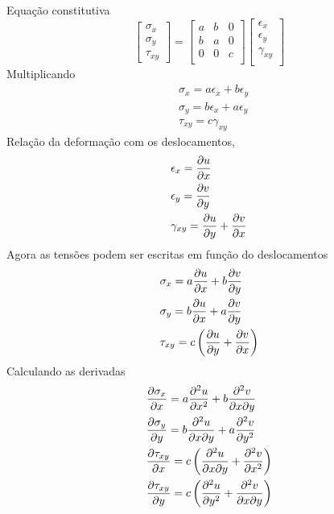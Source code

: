 Equação constitutiva
%
\begin{equation}
\begin{bmatrix}
	\sigma_x\\ 
	\sigma_y\\
	\tau_{xy}
\end{bmatrix}
=
\begin{bmatrix}
	a & b& 0\\ 
	b & a& 0\\ 
	0 & 0& c\\ 
\end{bmatrix}
\begin{bmatrix}
    \epsilon_x\\ 
	\epsilon_y\\ 
	\gamma_{xy}\\  
\end{bmatrix}
\end{equation}
%
Multiplicando 
%
\begin{equation}
	\begin{split}
		&\sigma_x = a \epsilon_x + b \epsilon_y\\
		&\sigma_y = b \epsilon_x + a \epsilon_y\\
		&\tau_{xy} = c \gamma_{xy}
	\end{split}
\end{equation}
%
Relação da deformação com os deslocamentos,
%
\begin{equation}
	\begin{split}
		&\epsilon_x = \frac{\partial u}{\partial x}\\
		&\epsilon_y = \frac{\partial v}{\partial y}\\
		&\gamma_{xy} = \frac{\partial u}{\partial y} + \frac{\partial v}{\partial x}
	\end{split}
\end{equation}
%
Agora as tensões podem ser escritas em função do deslocamentos
\begin{equation}
	\begin{split}
		&\sigma_x = a \frac{\partial u}{\partial x} + b \frac{\partial v}{\partial y}\\
		&\sigma_y = b \frac{\partial u}{\partial x} + a \frac{\partial v}{\partial y}\\
		&\tau_{xy} = c \left(\frac{\partial u}{\partial y} + \frac{\partial v}{\partial x}\right)
	\end{split}
\end{equation}
%
Calculando as derivadas
%
\begin{equation}
	\begin{split}
		&\frac{\partial \sigma_x}{\partial x} = a \frac{\partial^2 u}{\partial x^2} + b \frac{\partial^2 v}{\partial x \partial y} \\
		&\frac{\partial \sigma_y}{\partial y} = b \frac{\partial^2 u}{\partial x \partial y} + a \frac{\partial^2 v}{\partial y^2}\\
		&\frac{\partial \tau_{xy}}{\partial x} = c \left(\frac{\partial^2 u}{\partial x \partial y} + \frac{\partial^2 v}{\partial x^2}\right)\\
		&\frac{\partial \tau_{xy}}{\partial y} = c \left(\frac{\partial^2 u}{\partial y^2} + \frac{\partial^2 v}{\partial x \partial y}\right)
	\end{split}
\end{equation}
